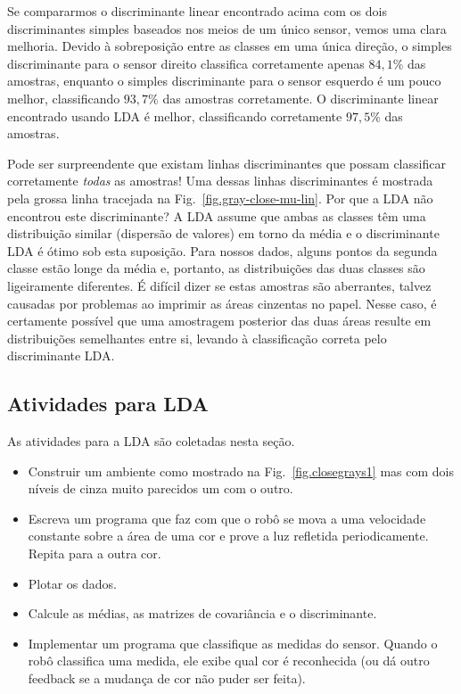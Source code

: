 Se compararmos o discriminante linear encontrado acima com os dois discriminantes simples baseados nos meios de um único sensor, vemos uma clara melhoria. Devido à sobreposição entre as classes em uma única direção, o simples discriminante para o sensor direito classifica corretamente apenas $84,1\%$ das amostras, enquanto o simples discriminante para o sensor esquerdo é um pouco melhor, classificando $93,7\%$ das amostras corretamente. O discriminante linear encontrado usando LDA é melhor, classificando corretamente $97,5\%$ das amostras.

Pode ser surpreendente que existam linhas discriminantes que possam classificar corretamente \emph{todas} as amostras! Uma dessas linhas discriminantes é mostrada pela grossa linha tracejada na Fig.~\ref{fig.gray-close-mu-lin}. Por que a LDA não encontrou este discriminante? A LDA assume que ambas as classes têm uma distribuição similar (dispersão de valores) em torno da média e o discriminante LDA é ótimo sob esta suposição. Para nossos dados, alguns pontos da segunda classe estão longe da média e, portanto, as distribuições das duas classes são ligeiramente diferentes. É difícil dizer se estas amostras são aberrantes, talvez causadas por problemas ao imprimir as áreas cinzentas no papel. Nesse caso, é certamente possível que uma amostragem posterior das duas áreas resulte em distribuições semelhantes entre si, levando à classificação correta pelo discriminante LDA.

\subsection{Atividades para LDA}

As atividades para a LDA são coletadas nesta seção.

\begin{framed}
\begin{itemize}
\item Construir um ambiente como mostrado na Fig.~\ref{fig.closegrays1} mas com dois níveis de cinza muito parecidos um com o outro.
\item Escreva um programa que faz com que o robô se mova a uma velocidade constante sobre a área de uma cor e prove a luz refletida periodicamente. Repita para a outra cor.
\item Plotar os dados.
\item Calcule as médias, as matrizes de covariância e o discriminante. 
\item Implementar um programa que classifique as medidas do sensor. Quando o robô classifica uma medida, ele exibe qual cor é reconhecida (ou dá outro feedback se a mudança de cor não puder ser feita).
\end{itemize}
\end{framed}

